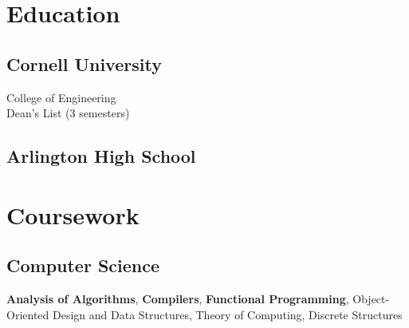 \documentclass[]{deedy-resume-openfont}
\let\sectionold\section
\renewcommand{\section}[1]{
	\sectionold{\textcolor{sectiontitlecolor}{#1}}
}
\begin{document}
%
%

%
%



%
%

\begin{minipage}[t]{0.33\textwidth} 


\section{Education} 

\subsection{Cornell University}

College of Engineering \\
Dean's List (3 semesters) \\
\sectionsep

\subsection{Arlington High School}
\sectionsep



\section{Coursework}
\subsection{Computer Science}
\textbf{Analysis of Algorithms}, \textbf{Compilers}, \textbf{Functional Programming}, Object-Oriented Design and Data Structures, Theory of Computing, Discrete Structures
\sectionsep


\end{minipage}
\end{document}
